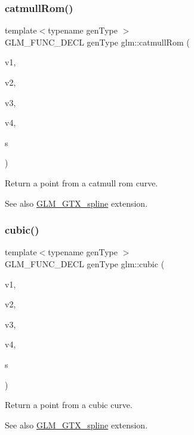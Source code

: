 \subsubsection{\texorpdfstring{catmull\+Rom()}{catmullRom()}}
{\footnotesize\ttfamily template$<$typename gen\+Type $>$ \\
G\+L\+M\+\_\+\+F\+U\+N\+C\+\_\+\+D\+E\+CL gen\+Type glm\+::catmull\+Rom (\begin{DoxyParamCaption}\item[{gen\+Type const \&}]{v1,  }\item[{gen\+Type const \&}]{v2,  }\item[{gen\+Type const \&}]{v3,  }\item[{gen\+Type const \&}]{v4,  }\item[{typename gen\+Type\+::value\+\_\+type const \&}]{s }\end{DoxyParamCaption})}

Return a point from a catmull rom curve. \begin{DoxySeeAlso}{See also}
\hyperlink{group__gtx__spline}{G\+L\+M\+\_\+\+G\+T\+X\+\_\+spline} extension. 
\end{DoxySeeAlso}
\mbox{\label{group__gtx__spline_ga6b867eb52e2fc933d2e0bf26aabc9a70}} 
\subsubsection{\texorpdfstring{cubic()}{cubic()}}
{\footnotesize\ttfamily template$<$typename gen\+Type $>$ \\
G\+L\+M\+\_\+\+F\+U\+N\+C\+\_\+\+D\+E\+CL gen\+Type glm\+::cubic (\begin{DoxyParamCaption}\item[{gen\+Type const \&}]{v1,  }\item[{gen\+Type const \&}]{v2,  }\item[{gen\+Type const \&}]{v3,  }\item[{gen\+Type const \&}]{v4,  }\item[{typename gen\+Type\+::value\+\_\+type const \&}]{s }\end{DoxyParamCaption})}

Return a point from a cubic curve. \begin{DoxySeeAlso}{See also}
\hyperlink{group__gtx__spline}{G\+L\+M\+\_\+\+G\+T\+X\+\_\+spline} extension. 
\end{DoxySeeAlso}
\mbox{\label{group__gtx__spline_gaa69e143f6374d32f934a8edeaa50bac9}} 
